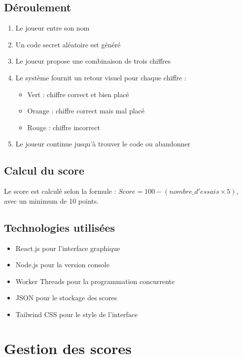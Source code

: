 \documentclass{article}
\begin{document}
\subsection{Déroulement}
\begin{enumerate}
    \item Le joueur entre son nom
    \item Un code secret aléatoire est généré
    \item Le joueur propose une combinaison de trois chiffres
    \item Le système fournit un retour visuel pour chaque chiffre :
    \begin{itemize}
        \item Vert : chiffre correct et bien placé
        \item Orange : chiffre correct mais mal placé
        \item Rouge : chiffre incorrect
    \end{itemize}
    \item Le joueur continue jusqu'à trouver le code ou abandonner
\end{enumerate}

\subsection{Calcul du score}
Le score est calculé selon la formule : $Score = 100 - (nombre\_d'essais \times 5)$, avec un minimum de 10 points.


\subsection{Technologies utilisées}
\begin{itemize}
    \item React.js pour l'interface graphique
    \item Node.js pour la version console
    \item Worker Threads pour la programmation concurrente
    \item JSON pour le stockage des scores
    \item Tailwind CSS pour le style de l'interface
\end{itemize}




\section{Gestion des scores}
\end{document}
